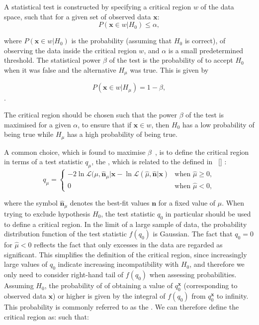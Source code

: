 A statistical test is constructed by specifying a critical region $w$ of the data space, such that for a given set of observed data $\mathbf{x}$:
\begin{equation}
P(\mathbf{x} \in w | H_{0} ) \leq \alpha,
\end{equation}

where  $P(\mathbf{x} \in w | H_{0} ) $ is the probability (assuming that $H_{0}$ is correct), of observing the data inside the critical region $w$, and $\alpha$ is a small predetermined threshold. The statistical power $\beta$ of the test is the probability of to accept $H_{0}$ when it was false and the alternative $H_{\mu} $ was true. This is given by

\begin{equation}
P(\mathbf{x} \in  w | H_{\mu} ) = 1 - \beta,
\end{equation}.

The critical region should be chosen such that the power $\beta$ of the test is maximised for a given $\alpha$, to ensure that if $\mathbf{x} \in w$, then $H_{0}$ has a low probability of being true while $H_{\mu}$ has a high probability of being true.  

A common choice, which is found to maximise $\beta$~\cite{}, is to define the critical region in terms of a test statistic $q_{\mu}$, the \DNLL,  which is related to the \NLL defined in \Sec~\ref{} :
\begin{equation}
q_{\mu} = \begin{cases} 
  -2 \ln \mathcal{L}(\mu,\hat{\mathbf{n}}_{\mu}| \mathbf{x}- \ln\mathcal{L}(\hat{\mu},\hat{\mathbf{n}}| \mathbf{x} ) & \text{when } \hat{\mu} \geq 0, \\
  0 & \text{when } \hat{\mu} < 0, 
  \end{cases}
\end{equation}

where the symbol $\hat{\mathbf{n}}_{\mu}$ denotes the best-fit values $\mathbf{n}$ for a fixed value of $\mu$. When trying to exclude hypothesis $H_{0}$, the test statistic $q_0$ in particular should be used to define a critical region. In the limit of a large sample of data, the probability distribution function of the test statistic $f(q_0)$ is Gaussian. The fact that $q_{0} =0$ for $\hat{\mu} < 0$ reflects the fact that only excesses in the data are regarded as significant. This simplifies the definition of the critical region, since increasingly large values of $q_0$ indicate increasing incompatibility with $H_{0}$, and therefore we only need to consider right-hand tail of $f(q_0)$ when assessing probabilities. Assuming $H_{0}$, the probability of of obtaining a value of $q^{\mathbf{x}}_{0}$ (corresponding to observed data $ \mathbf{x}$) or higher is given by the integral of $f(q_0)$ from $q^{\mathbf{x}}_{0}$ to infinity. This probability is commonly referred to as the \pvalue. We can therefore define the critical region as:  
such that:

